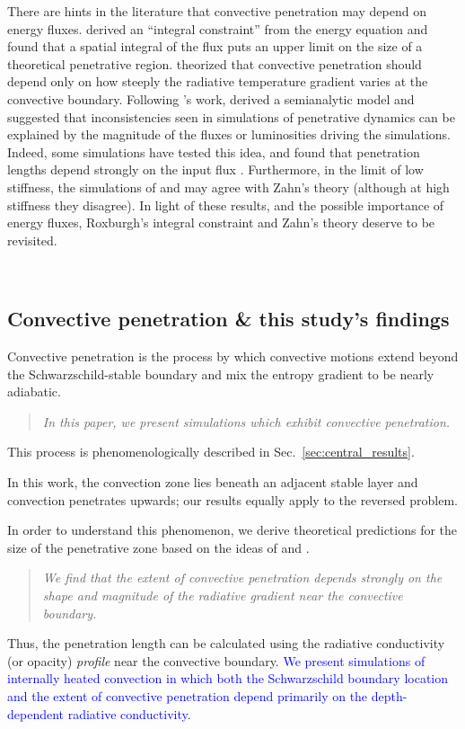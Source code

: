 \documentclass[twocolumn, linenumbers]{aastex631}
\newcommand{\editone}[1]{#1}
\newcommand{\edittwo}[1]{\textcolor{blue}{#1}}
\begin{document}
There are hints in the literature that convective penetration may depend on energy fluxes.
\citet{roxburgh1978, roxburgh1989, roxburgh1992, roxburgh1998} derived an ``integral constraint'' from the energy equation and found that a spatial integral of the flux puts an upper limit on the size of a theoretical penetrative region.
\citet{zahn1991} theorized that convective penetration should depend only on how steeply the radiative temperature gradient varies at the convective boundary.
Following \citet{zahn1991}'s work, \citet{rempel2004} derived a semianalytic model and suggested that inconsistencies seen in simulations of penetrative dynamics can be explained by the magnitude of the fluxes or luminosities driving the simulations.
Indeed, some simulations have tested this idea, and found that penetration lengths depend strongly on the input flux \citep{singh_etal_1998, kapyla_etal_2007, tian_etal_2009, hotta2017, kapyla2019}.
Furthermore, in the limit of low stiffness, the simulations of \citet{hurlburt_etal_1994} and \citet{rogers_glatzmaier_2005} may agree with Zahn's theory (although at high stiffness they disagree).
In light of these results, and the possible importance of energy fluxes, Roxburgh's integral constraint and Zahn's theory deserve to be revisited.


$\,$
\subsection{Convective penetration \& this study's findings}

Convective penetration is the process by which convective motions extend beyond the Schwarzschild-stable boundary and mix the entropy gradient to be nearly adiabatic.
\begin{quote}
\emph{
    In this paper, we present simulations which exhibit convective penetration.
}
\end{quote}
This process is phenomenologically described in Sec.~\ref{sec:central_results}.
\editone{
    In this work, the convection zone lies beneath an adjacent stable layer and convection penetrates upwards; our results equally apply to the reversed problem.
}

In order to understand this phenomenon, we derive theoretical predictions for the size of the penetrative zone based on the ideas of \citet{roxburgh1989} and \citet{zahn1991}.
\begin{quote}
\emph{
We find that the extent of convective penetration depends strongly on the shape and magnitude of the radiative gradient near the convective boundary.
}
\end{quote}
Thus, the penetration length can be calculated using the radiative conductivity (or opacity) \emph{profile} near the convective boundary.
\edittwo{
    We present simulations of internally heated convection in which both the Schwarzschild boundary location and the extent of convective penetration depend primarily on the depth-dependent radiative conductivity.
}
\end{document}
